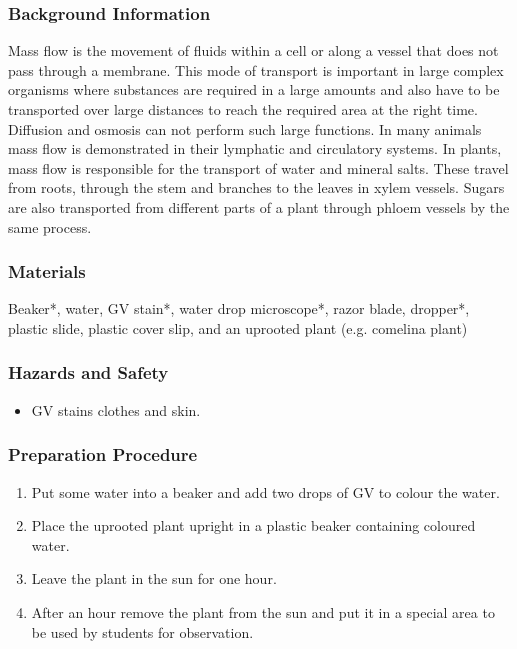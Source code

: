 \subsubsection*{Background Information}
Mass flow is the movement of fluids within a cell or along a vessel that does not pass through a membrane. This mode of transport is important in large complex organisms where substances are required in a large amounts and also have to be transported over large distances to reach the required area at the right time. Diffusion and osmosis can not perform such large functions. In many animals mass flow is demonstrated in their lymphatic and circulatory systems. In plants, mass flow is responsible for the transport of water and mineral salts. These travel from roots, through the stem and branches to the leaves in xylem vessels. Sugars are also transported from different parts of a plant through phloem vessels by the same process.

\subsubsection*{Materials}
Beaker*, water, GV stain*, water drop microscope*, razor blade, dropper*, plastic slide, plastic cover slip, and an uprooted plant (e.g. comelina plant)

\subsubsection*{Hazards and Safety}
\begin{itemize}
\item{GV stains clothes and skin.}
\end{itemize}

\subsubsection*{Preparation Procedure}
\begin{enumerate}
\item{Put some water into a beaker and add two drops of GV to colour the water.}
\item{Place the uprooted plant upright in a plastic beaker containing coloured water.}
\item{Leave the plant in the sun for one hour.}
\item{After an hour remove the plant from the sun and put it in a special area to be used by students for observation.}
\end{enumerate}

